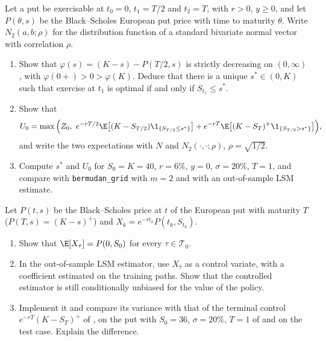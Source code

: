 \begin{exercise}\label{ex:am-two-dates}
\hard Let a put be exercisable at $t_0=0$, $t_1=T/2$ and $t_2=T$, with $r>0$, $y\ge0$, and
let $P(\theta,s)$ be the Black--Scholes European put price with time to maturity $\theta$.
Write $N_2(a,b;\rho)$ for the distribution function of a standard bivariate normal vector
with correlation $\rho$.
\begin{enumerate}[label=(\alph*)]
  \item Show that $\varphi(s)=(K-s)-P(T/2,s)$ is strictly decreasing on $(0,\infty)$, with
    $\varphi(0+)>0>\varphi(K)$. Deduce that there is a unique $s^*\in(0,K)$ such that
    exercise at $t_1$ is optimal if and only if $S_{t_1}\le s^*$.
  \item Show that
    \[
      U_0=\max\Big(Z_0,\ e^{-rT/2}\E\big[(K-S_{T/2})\1_{\{S_{T/2}\le s^*\}}\big]
      +e^{-rT}\E\big[(K-S_T)^+\1_{\{S_{T/2}>s^*\}}\big]\Big),
    \]
    and write the two expectations with $N$ and $N_2(\cdot,\cdot;\rho)$, $\rho=\sqrt{1/2}$.
  \item Compute $s^*$ and $U_0$ for $S_0=K=40$, $r=6\%$, $y=0$, $\sigma=20\%$, $T=1$, and
    compare with \texttt{bermudan\_grid} with $m=2$ and with an out-of-sample LSM estimate.
\end{enumerate}
\end{exercise}

\begin{exercise}\label{ex:am-stopped-control}
\medium Let $P(t,s)$ be the Black--Scholes price at $t$ of the European put with maturity
$T$ ($P(T,s)=(K-s)^+$) and $X_k=e^{-rt_k}P(t_k,S_{t_k})$.
\begin{enumerate}[label=(\alph*)]
  \item Show that $\E[X_\tau]=P(0,S_0)$ for every $\tau\in\mathcal T_0$.
  \item In the out-of-sample LSM estimator, use $X_{\hat\tau}$ as a control variate, with a
    coefficient estimated on the training paths. Show that the controlled estimator is
    still conditionally unbiased for the value of the policy.
  \item Implement it and compare its variance with that of the terminal control
    $e^{-rT}(K-S_T)^+$ of , on the put with $S_0=36$, $\sigma=20\%$,
    $T=1$ of  and on the test case. Explain the difference.
\end{enumerate}
\end{exercise}

